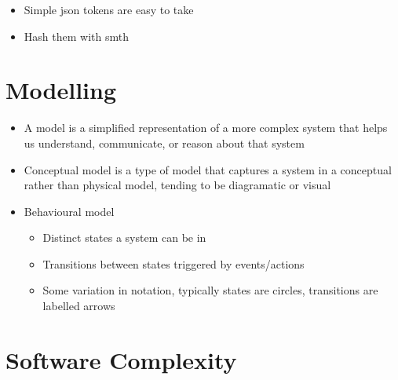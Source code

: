 \documentclass{report}
\begin{document}
	\begin{itemize}
		\item Simple json tokens are easy to take
		\item Hash them with smth
	\end{itemize}

\chapter{Modelling}

	\begin{itemize}
		\item A model is a simplified representation of a more complex system that helps us understand, communicate, or reason about that system
		\item Conceptual model is a type of model that captures a system in a conceptual rather than physical model, tending to be diagramatic or visual
		\item Behavioural model
			\begin{itemize}
				\item Distinct states a system can be in
				\item Transitions between states triggered by events/actions
				\item Some variation in notation, typically states are circles, transitions are labelled arrows
			\end{itemize}
	\end{itemize}

\chapter{Software Complexity}
\end{document}
